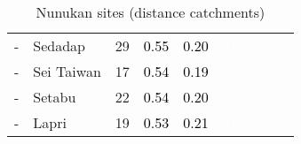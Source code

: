 \begin{table}[ht]
\begin{tabular}{C{0.05\textwidth}C{0.15\textwidth}C{0.08\textwidth}C{0.08\textwidth}C{0.08\textwidth}C{0.08\textwidth}C{0.08\textwidth}C{0.08\textwidth}C{0.08\textwidth}C{0.08\textwidth}}
  {-} & Sedadap &  29 & \textcolor[HTML]{000000}{0.55} & \textcolor[HTML]{000000}{0.20} & \textcolor[HTML]{FFFFFF}{4} &  &  &  &  \\ 
  {-} & Sei Taiwan &  17 & \textcolor[HTML]{000000}{0.54} & \textcolor[HTML]{000000}{0.19} & \textcolor[HTML]{FFFFFF}{4} &  &  &  &  \\ 
  {-} & Setabu &  22 & \textcolor[HTML]{000000}{0.54} & \textcolor[HTML]{000000}{0.20} & \textcolor[HTML]{FFFFFF}{4} &  &  &  &  \\ 
  {-} & Lapri &  19 & \textcolor[HTML]{000000}{0.53} & \textcolor[HTML]{000000}{0.21} & \textcolor[HTML]{FFFFFF}{4} &  &  &  &  \\ 
  \end{tabular}
\endgroup
\caption{Nunukan sites (distance catchments)} 
\end{table}

